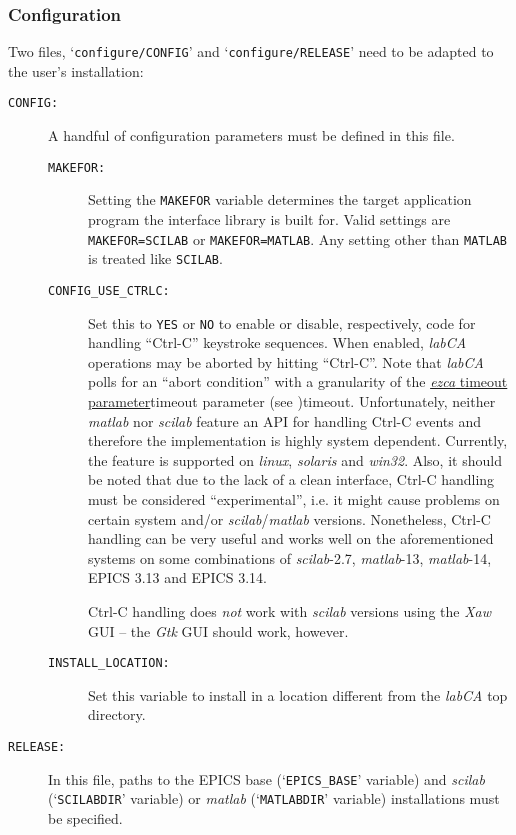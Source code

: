 \documentclass{article}
\newcommand{\sca}{\ita{labCA}}
\newcommand{\scilab}{\ita{scilab}}
\newcommand{\matlab}{\ita{matlab}}
\newcommand{\windoze}{\ita{win32}}
\newcommand{\linux}{\ita{linux}}
\newcommand{\solaris}{\ita{solaris}}
\newcommand{\ezca}{\ita{ezca}}
\newcommand{\com}[1]{{\tt #1}}
\newcommand{\ita}[1]{\emph{#1}}
\begin{document}
\subsubsection{Configuration}
Two files, `\com{configure/CONFIG}' and `\com{configure/RELEASE}' need to
be adapted to the user's installation:
\begin{description}
\item[\tt CONFIG:] A handful of configuration parameters must be defined
in this file.
\begin{description}
\item[\tt MAKEFOR:] Setting the \com{MAKEFOR} variable
determines the target application program the interface library is
built for. Valid settings are \com{MAKEFOR=SCILAB} or \com{MAKEFOR=MATLAB}.
Any setting other than \com{MATLAB} is treated like \com{SCILAB}.

\item[\tt CONFIG\_USE\_CTRLC:] Set this to {\tt YES} or {\tt NO} to enable
or disable, respectively, code for handling ``Ctrl-C'' keystroke sequences.
When enabled, \sca{} operations may be aborted by hitting ``Ctrl-C''. Note
that \sca{} polls for an ``abort condition'' with a granularity of the
\hyperref[ref]{\ezca{} timeout parameter}{timeout parameter (see }{ )}{timeout}.
Unfortunately, neither \matlab{} nor \scilab{} feature an API for handling
Ctrl-C events and therefore the implementation is highly system dependent.
Currently, the feature is supported on \linux, \solaris{} and \windoze.
Also, it should be noted that due to the lack of a clean interface, Ctrl-C
handling must be considered ``experimental'', i.e. it might cause problems
on certain system and/or \scilab/\matlab{} versions. Nonetheless, Ctrl-C
handling can be very useful and works well on the aforementioned
systems on some combinations of \scilab-2.7, \matlab-13, \matlab-14, EPICS 3.13
and EPICS 3.14.

Ctrl-C handling does {\em not} work with \scilab{}
versions using the {\em Xaw} GUI -- the {\em Gtk} GUI should work, however.

\item[\tt INSTALL\_LOCATION:] Set this variable to install in a location
different from the \sca{} top directory.
\end{description}
%
%
\item[\tt RELEASE:] In this file, paths to the EPICS base (`\com{EPICS\_BASE}'
variable) and \scilab{} (`\com{SCILABDIR}' variable) or \matlab{} (`\com{MATLABDIR}'
variable) installations must be specified.


\end{description}
\end{document}
